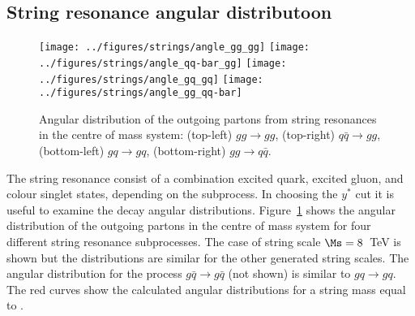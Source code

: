 \subsection{String resonance angular distributoon}

\begin{figure}[htb]
\begin{center}
\texttt{[image: ../figures/strings/angle\_gg\_gg]}
\texttt{[image: ../figures/strings/angle\_qq-bar\_gg]}
\texttt{[image: ../figures/strings/angle\_gq\_gq]}
\texttt{[image: ../figures/strings/angle\_gg\_qq-bar]}
\end{center}
\caption{Angular distribution of the outgoing partons from string
resonances in the centre of mass system: 
(top-left) $gg\to gg$,
(top-right) $q\bar{q}\to gg$,
(bottom-left) $gq\to gq$,
(bottom-right) $gg\to q\bar{q}$.}
\label{fig:stringangle}
\end{figure}

The string resonance consist of a combination excited quark, excited
gluon, and colour singlet states, depending on the subprocess.
In choosing the $y^*$ cut it is useful to examine the decay angular
distributions. 
Figure~\ref{fig:stringangle} shows the angular distribution of the outgoing partons
in the centre of mass system for four different string resonance
subprocesses. 
The case of string scale $\Ms = 8$~TeV is shown but the distributions
are similar for the other generated string scales.
The angular distribution for the process $g\bar{q}\to g\bar{q}$ (not
shown) is similar to $gq\to gq$.
The red curves show the calculated angular distributions for a string
mass equal to \Ms.
